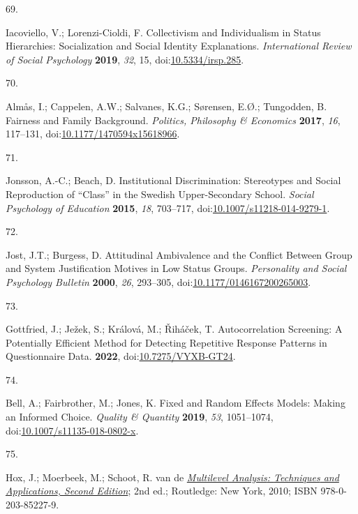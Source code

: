 \documentclass[
  12pt,
  letterpaper,
]{article}
\newlength{\cslhangindent}
\newlength{\csllabelwidth}
\newenvironment{CSLReferences}[2] %
 {\begin{list}{}{%
  \setlength{\itemindent}{0pt}
  \setlength{\leftmargin}{0pt}
  \setlength{\parsep}{0pt}
  \ifodd #1
   \setlength{\leftmargin}{\cslhangindent}
   \setlength{\itemindent}{-1\cslhangindent}
  \fi
  \setlength{\itemsep}{#2\baselineskip}}}
 {\end{list}}
\newcommand{\CSLLeftMargin}[1]{\parbox[t]{\csllabelwidth}{\strut#1\strut}}
\newcommand{\CSLRightInline}[1]{\parbox[t]{\linewidth - \csllabelwidth}{\strut#1\strut}}
\begin{document}
\begin{CSLReferences}{0}{0}
\CSLLeftMargin{69. }%
\CSLRightInline{Iacoviello, V.; Lorenzi-Cioldi, F. Collectivism and
{Individualism} in {Status Hierarchies}: {Socialization} and {Social
Identity Explanations}. \emph{International Review of Social Psychology}
\textbf{2019}, \emph{32}, 15,
doi:\href{https://doi.org/10.5334/irsp.285}{10.5334/irsp.285}.}

\CSLLeftMargin{70. }%
\CSLRightInline{Almås, I.; Cappelen, A.W.; Salvanes, K.G.; Sørensen,
E.Ø.; Tungodden, B. Fairness and Family Background. \emph{Politics,
Philosophy \& Economics} \textbf{2017}, \emph{16}, 117--131,
doi:\href{https://doi.org/10.1177/1470594x15618966}{10.1177/1470594x15618966}.}

\CSLLeftMargin{71. }%
\CSLRightInline{Jonsson, A.-C.; Beach, D. Institutional Discrimination:
{Stereotypes} and Social Reproduction of {``Class''} in the {Swedish}
Upper-Secondary School. \emph{Social Psychology of Education}
\textbf{2015}, \emph{18}, 703--717,
doi:\href{https://doi.org/10.1007/s11218-014-9279-1}{10.1007/s11218-014-9279-1}.}

\CSLLeftMargin{72. }%
\CSLRightInline{Jost, J.T.; Burgess, D. Attitudinal {Ambivalence} and
the {Conflict} Between {Group} and {System Justification Motives} in
{Low Status Groups}. \emph{Personality and Social Psychology Bulletin}
\textbf{2000}, \emph{26}, 293--305,
doi:\href{https://doi.org/10.1177/0146167200265003}{10.1177/0146167200265003}.}

\CSLLeftMargin{73. }%
\CSLRightInline{Gottfried, J.; Ježek, S.; Králová, M.; Řiháček, T.
Autocorrelation {Screening}: {A Potentially Efficient Method} for
{Detecting Repetitive Response Patterns} in {Questionnaire Data}.
\textbf{2022},
doi:\href{https://doi.org/10.7275/VYXB-GT24}{10.7275/VYXB-GT24}.}

\CSLLeftMargin{74. }%
\CSLRightInline{Bell, A.; Fairbrother, M.; Jones, K. Fixed and Random
Effects Models: Making an Informed Choice. \emph{Quality \& Quantity}
\textbf{2019}, \emph{53}, 1051--1074,
doi:\href{https://doi.org/10.1007/s11135-018-0802-x}{10.1007/s11135-018-0802-x}.}

\CSLLeftMargin{75. }%
\CSLRightInline{Hox, J.; Moerbeek, M.; Schoot, R. van de
\emph{\href{https://doi.org/10.4324/9780203852279}{Multilevel
{Analysis}: {Techniques} and {Applications}, {Second Edition}}}; 2nd
ed.; Routledge: New York, 2010; ISBN 978-0-203-85227-9.}


\end{CSLReferences}
\end{document}
